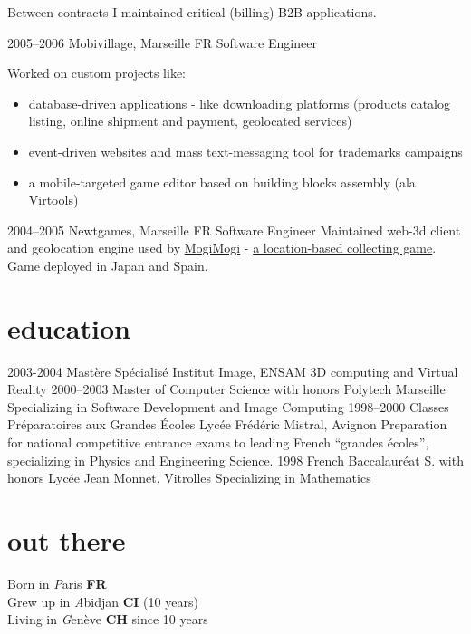 \documentclass[]{friggeri}
\begin{document}
\begin{entrylist}
{\begin{itemize}
    \end{itemize}
    Between contracts I maintained critical (billing) B2B applications.}
  \entry
    {2005–2006}
    {Mobivillage, Marseille FR}
    {Software Engineer}
    {Worked on custom projects like:
    \begin{itemize}
    \item database-driven applications - like downloading platforms
    (products catalog listing, online shipment and payment, geolocated services)
    \item event-driven websites and mass text-messaging tool for
    trademarks campaigns
    \item a mobile-targeted game editor based on building blocks
    assembly (ala Virtools)
    \end{itemize}}
  \entry
    {2004–2005}
    {Newtgames, Marseille FR}
    {Software Engineer}
    {Maintained web-3d client and geolocation engine used by
    \href{http://mogimogi.com}{MogiMogi} - \href{http://thefeaturearchives.com/100501.html}{a location-based collecting game}.
    Game deployed in Japan and Spain.}
\end{entrylist}

\clearpage

\section{education}

\begin{entrylist}
  \entry
    {2003-2004}
    {Mastère Spécialisé}
    {Institut Image, ENSAM}
    {3D computing and Virtual Reality}
  \entry
    {2000–2003}
    {Master of Computer Science with honors}
    {Polytech Marseille}
    {Specializing in Software Development and Image Computing}
  \entry
    {1998–2000}
    {Classes Préparatoires aux Grandes Écoles}
    {Lycée Frédéric Mistral, Avignon}
    {Preparation for national competitive entrance exams to leading French
    ``grandes écoles'', specializing in Physics and Engineering Science.}
  \entry
    {1998}
    {French Baccalauréat S. with honors}
    {Lycée Jean Monnet, Vitrolles}
    {Specializing in Mathematics}
\end{entrylist}

\section{out there}

{\FA \faMapPin} Born in {\emph Paris} {\bf FR}\\
{\FA \faPlane} Grew up in {\emph Abidjan} {\bf CI} (10 years)\\
{\FA \faPlane} Living in {\emph Genève} {\bf CH} since 10 years
\end{document}
